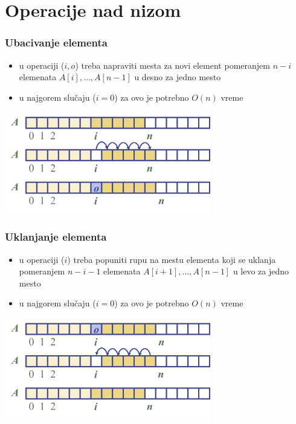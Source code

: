 \documentclass[compress,aspectratio=169]{beamer}
\begin{document}
\section[Operacije]{Operacije nad nizom}
\begin{frame}[fragile]
  \frametitle{Ubacivanje elementa}
  \begin{itemize}
    \item u operaciji ($i, o$) treba napraviti mesta za novi element
    pomeranjem $n-i$ elemenata $A[i], \ldots, A[n-1]$ u desno za jedno mesto
    \item u najgorem slučaju ($i = 0$) za ovo je potrebno $O(n)$ vreme
  \end{itemize}
  \begin{center}
    \includegraphics[width=9cm]{asp-04-pic04.png}
  \end{center}
\end{frame}

\begin{frame}[fragile]
  \frametitle{Uklanjanje elementa}
  \begin{itemize}
    \item u operaciji ($i$) treba popuniti rupu na mestu elementa
    koji se uklanja pomeranjem $n-i-1$ elemenata $A[i+1], \ldots, A[n-1]$ u
    levo za jedno mesto
    \item u najgorem slučaju ($i = 0$) za ovo je potrebno $O(n)$ vreme
  \end{itemize}
  \begin{center}
    \includegraphics[width=9cm]{asp-04-pic05.png}
  \end{center}
\end{frame}
\end{document}
